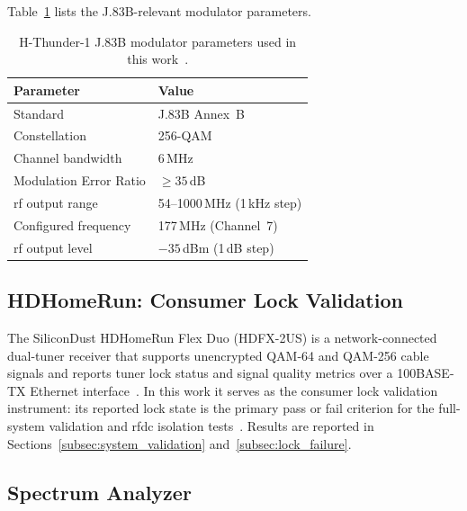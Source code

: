 Table~\ref{tab:hthunder_spec} lists the J.83B-relevant modulator
parameters.

\begin{table}[htbp]
  \caption{H-Thunder-1 J.83B modulator parameters used in this
           work~\cite{ThorH1}.}
  \label{tab:hthunder_spec}
  \centering
  \small
  \begin{tabular}{ll}
    \hline
    Parameter                   & Value \\
    \hline
    Standard                    & J.83B Annex~B \\[2pt]
    Constellation               & 256-QAM \\[2pt]
    Channel bandwidth           & 6\,MHz \\[2pt]
    Modulation Error Ratio      & $\geq 35$\,dB \\[2pt]
    \ac{rf} output range        & 54--1000\,MHz (1\,kHz step) \\[2pt]
    Configured frequency        & 177\,MHz (Channel~7) \\[2pt]
    \ac{rf} output level        & $-35$\,dBm (1\,dB step) \\
    \hline
  \end{tabular}
\end{table}

\subsection{HDHomeRun: Consumer Lock Validation}
\label{subsec:hdhomerun}

The SiliconDust HDHomeRun Flex Duo (HDFX-2US) is a network-connected
dual-tuner receiver that supports unencrypted QAM-64 and QAM-256
cable signals and reports tuner lock status and signal quality metrics
over a 100BASE-TX Ethernet interface~\cite{HDHomeRun}.
In this work it serves as the consumer lock validation instrument:
its reported lock state is the primary pass or fail criterion for
the full-system validation and \ac{rfdc} isolation
tests~\cite{HDHomeRun}.
Results are reported in Sections~\ref{subsec:system_validation}
and~\ref{subsec:lock_failure}.

\subsection{Spectrum Analyzer}
\label{subsec:spectrum_analyzer}

